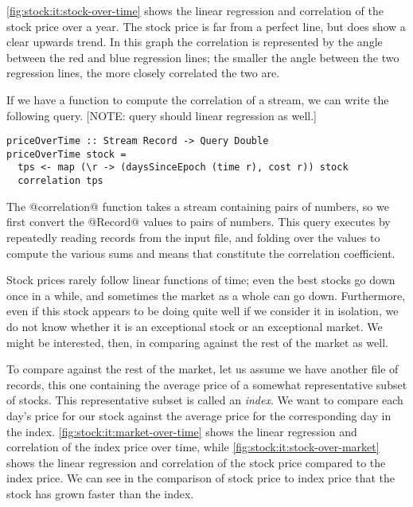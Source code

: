 

\autoref{fig:stock:it:stock-over-time} shows the linear regression and correlation of the stock price over a year.
The stock price is far from a perfect line, but does show a clear upwards trend.
In this graph the correlation is represented by the angle between the red and blue regression lines; the smaller the angle between the two regression lines, the more closely correlated the two are.


If we have a function to compute the correlation of a stream, we can write the following query.
[NOTE: query should linear regression as well.]

\begin{lstlisting}
priceOverTime :: Stream Record -> Query Double
priceOverTime stock =
  tps <- map (\r -> (daysSinceEpoch (time r), cost r)) stock
  correlation tps
\end{lstlisting}

The @correlation@ function takes a stream containing pairs of numbers, so we first convert the @Record@ values to pairs of numbers.
This query executes by repeatedly reading records from the input file, and folding over the values to compute the various sums and means that constitute the correlation coefficient.

Stock prices rarely follow linear functions of time; even the best stocks go down once in a while, and sometimes the market as a whole can go down.
Furthermore, even if this stock appears to be doing quite well if we consider it in isolation, we do not know whether it is an exceptional stock or an exceptional market.
We might be interested, then, in comparing against the rest of the market as well.

To compare against the rest of the market, let us assume we have another file of records, this one containing the average price of a somewhat representative subset of stocks.
This representative subset is called an \emph{index}.
We want to compare each day's price for our stock against the average price for the corresponding day in the index.
\autoref{fig:stock:it:market-over-time} shows the linear regression and correlation of the index price over time, while \autoref{fig:stock:it:stock-over-market} shows the linear regression and correlation of the stock price compared to the index price.
We can see in the comparison of stock price to index price that the stock has grown faster than the index.

